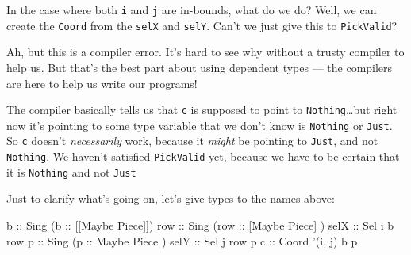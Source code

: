 \documentclass[]{article}
\newenvironment{Shaded}{}{}
\newcommand{\DataTypeTok}[1]{\textcolor[rgb]{0.56,0.13,0.00}{#1}}
\newcommand{\FunctionTok}[1]{\textcolor[rgb]{0.02,0.16,0.49}{#1}}
\newcommand{\KeywordTok}[1]{\textcolor[rgb]{0.00,0.44,0.13}{\textbf{#1}}}
\newcommand{\NormalTok}[1]{#1}
\newcommand{\OtherTok}[1]{\textcolor[rgb]{0.00,0.44,0.13}{#1}}
\begin{document}
In the case where both \texttt{i} and \texttt{j} are in-bounds, what do we do?
Well, we can create the \texttt{Coord} from the \texttt{selX} and \texttt{selY}.
Can't we just give this to \texttt{PickValid}?

\begin{Shaded}
\end{Shaded}

Ah, but this is a compiler error. It's hard to see why without a trusty compiler
to help us. But that's the best part about using dependent types --- the
compilers are here to help us write our programs!

The compiler basically tells us that \texttt{c} is supposed to point to
\texttt{\textquotesingle{}Nothing}\ldots{}but right now it's pointing to some
type variable that we don't know is \texttt{\textquotesingle{}Nothing} or
\texttt{\textquotesingle{}Just}. So \texttt{c} doesn't \emph{necessarily} work,
because it \emph{might} be pointing to \texttt{\textquotesingle{}Just}, and not
\texttt{\textquotesingle{}Nothing}. We haven't satisfied \texttt{PickValid} yet,
because we have to be certain that it is \texttt{\textquotesingle{}Nothing} and
not \texttt{\textquotesingle{}Just}

Just to clarify what's going on, let's give types to the names above:

\begin{Shaded}
\begin{Highlighting}[]
\OtherTok{b    ::} \DataTypeTok{Sing}\NormalTok{ (}\OtherTok{b   ::}\NormalTok{ [[}\DataTypeTok{Maybe} \DataTypeTok{Piece}\NormalTok{]])}
\OtherTok{row  ::} \DataTypeTok{Sing}\NormalTok{ (}\OtherTok{row ::}\NormalTok{  [}\DataTypeTok{Maybe} \DataTypeTok{Piece}\NormalTok{] )}
\OtherTok{selX ::} \DataTypeTok{Sel}\NormalTok{ i b row}
\OtherTok{p    ::} \DataTypeTok{Sing}\NormalTok{ (}\OtherTok{p   ::}   \DataTypeTok{Maybe} \DataTypeTok{Piece}\NormalTok{  )}
\OtherTok{selY ::} \DataTypeTok{Sel}\NormalTok{ j row p}
\OtherTok{c    ::} \DataTypeTok{Coord}\NormalTok{ '(i, j) b p}
\end{Highlighting}
\end{Shaded}
\end{document}
